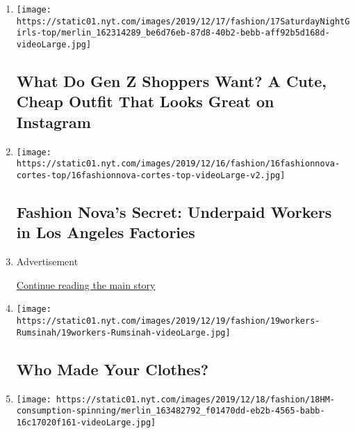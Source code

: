 \begin{enumerate}
\def\labelenumi{\arabic{enumi}.}
\item
  \texttt{[image: https://static01.nyt.com/images/2019/12/17/fashion/17SaturdayNightGirls-top/merlin\_162314289\_be6d76eb-87d8-40b2-bebb-aff92b5d168d-videoLarge.jpg]}

  \href{/2019/12/17/style/fast-fashion-gen-z.html}{}

  \hypertarget{what-do-gen-z-shoppers-want-a-cute-cheap-outfit-that-looks-great-on-instagram}{%
  \subsection{What Do Gen Z Shoppers Want? A Cute, Cheap Outfit That
  Looks Great on
  Instagram}\label{what-do-gen-z-shoppers-want-a-cute-cheap-outfit-that-looks-great-on-instagram}}
\item
  \texttt{[image: https://static01.nyt.com/images/2019/12/16/fashion/16fashionnova-cortes-top/16fashionnova-cortes-top-videoLarge-v2.jpg]}

  \href{/2019/12/16/business/fashion-nova-underpaid-workers.html}{}

  \hypertarget{fashion-novas-secret-underpaid-workers-in-los-angeles-factories}{%
  \subsection{Fashion Nova's Secret: Underpaid Workers in Los Angeles
  Factories}\label{fashion-novas-secret-underpaid-workers-in-los-angeles-factories}}
\item
  Advertisement

  \protect\hyperlink{after-mid1}{Continue reading the main story}
\item
  \texttt{[image: https://static01.nyt.com/images/2019/12/19/fashion/19workers-Rumsinah/19workers-Rumsinah-videoLarge.jpg]}

  \href{/2019/12/19/style/garment-workers-around-the-world.html}{}

  \hypertarget{who-made-your-clothes}{%
  \subsection{Who Made Your Clothes?}\label{who-made-your-clothes}}
\item
  \texttt{[image: https://static01.nyt.com/images/2019/12/18/fashion/18HM-consumption-spinning/merlin\_163482792\_f01470dd-eb2b-4565-babb-16c17020f161-videoLarge.jpg]}


\end{enumerate}
